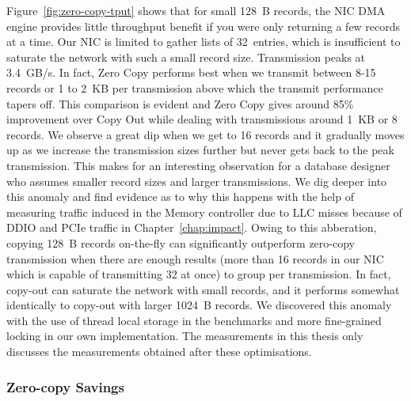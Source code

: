 
Figure~\ref{fig:zero-copy-tput} shows that for small 128~B records, the NIC DMA
engine provides little throughput benefit if you were only returning a few records 
at a time. Our NIC is limited to gather lists
of 32~entries, which is insufficient to saturate the network with such a small
record size. Transmission peaks at 3.4~GB/s. In fact, Zero Copy performs best when
we transmit between 8-15 records or 1 to 2~KB per transmission above which the transmit performance 
tapers off. This comparison is evident and Zero Copy gives around 85\% improvement over Copy Out while dealing 
with transmissions around 1~KB or 8 records. We observe a great dip when we get to 16 records and it gradually moves up as we 
increase the transmission sizes further but never gets back to the peak transmission. This makes 
for an interesting observation for a database designer who assumes smaller record sizes and larger 
transmissions. We dig deeper into this anomaly and find evidence as to why this happens with the 
help of measuring traffic induced in the Memory controller due to LLC misses because of DDIO and 
PCIe traffic in Chapter~\ref{chap:impact}. Owing to this abberation, copying 128~B records 
on-the-fly can significantly outperform zero-copy transmission when there are 
enough results (more than 16 records in our NIC which is capable of transmitting 32 at once) to group per transmission.
In fact, copy-out can saturate the network with small records, and it
performs somewhat identically to copy-out with larger 1024~B records. We discovered this anomaly 
with the use of thread local storage in the benchmarks and more fine-grained locking 
in our own implementation. The measurements in this thesis only discusses the 
measurements obtained after these optimisations.

\subsubsection{Zero-copy Savings}
\label{sec:overhead}

